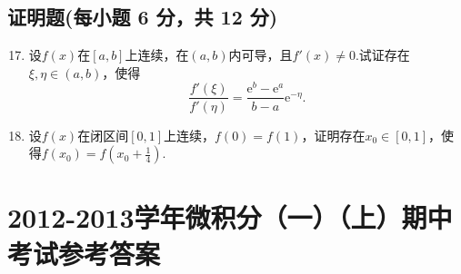\documentclass[../Main.tex]{subfiles}
\begin{document}
\section{证明题(每小题 6 分，共 12 分)}
\begin{enumerate}
    \setcounter{enumi}{16}
    \item 设$f(x)$在$[a,b]$上连续，在$(a,b)$内可导，且$f'(x)\neq0$.试证存在$\xi
              ,\eta\in(a,b)$，使得
          \[
              \frac{f'(\xi)}{f'(\eta)}=\frac{\mathrm{e}^{b}-\mathrm{e}^{a}}{b-a}\mathrm{e}
              ^{-\eta}.
          \]
          \vspace{12em}

    \item 设$f(x)$在闭区间$[0,1]$上连续，$f(0)=f(1)$，证明存在$x_{0}\in[0,1]$，使得$f
              (x_{0})=f\left(x_{0}+\frac{1}{4}\right)$.
          \vspace{12em}
\end{enumerate}

\chapter{2012-2013学年微积分（一）（上）期中考试参考答案}
\end{document}
